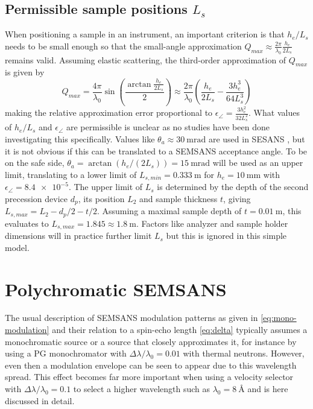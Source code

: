 \subsection{Permissible sample positions $L_s$}
When positioning a sample in an instrument, an important criterion is that $h_e/L_s$ needs to be small enough so that the small-angle approximation $Q_{max} \approx \frac{2\pi}{\lambda_0}\frac{h_e}{2L_s}$ remains valid. Assuming elastic scattering, the third-order approximation of $Q_{max}$ is given by
$$Q_{max} = \frac{4\pi}{\lambda_0}\sin(\frac{\arctan\frac{h_e}{2L_s}}{2}) \approx  \frac{2\pi}{\lambda_0}(\frac{h_e}{2L_s} - \frac{3h_e^3}{64L_s^3})$$
making the relative approximation error proportional to $\epsilon_\angle = \frac{3h_e^2}{32L_s^2}$. What values of $h_e/L_s$ and $\epsilon_\angle$ are permissible is unclear as no studies have been done investigating this specifically. Values like $\theta_a \approx \SI{30}{\milli\radian}$ are used in SESANS \cite{rekveldt1996}, but it is not obvious if this can be translated to a SEMSANS acceptance angle. To be on the safe side, $\theta_a = \arctan\left(h_e / (2L_s)\right) = \SI{15}{\milli\radian}$ will be used as an upper limit, translating to a lower limit of $L_{s,min} = \SI{0.333}{\meter}$ for $h_e = \SI{10}{\milli\meter}$ with $\epsilon_\angle = \num{8.4e-5}$. 
The upper limit of $L_s$ is determined by the depth of the second precession device $d_p$, its position $L_2$ and sample thickness $t$, giving $L_{s,max} = L_2 - d_p / 2 - t/2$. Assuming a maximal sample depth of $t=\SI{0.01}{\meter}$, this evaluates to $L_{s,max} = 1.845 \approx \SI{1.8}{\meter}$. Factors like analyzer and sample holder dimensions will in practice further limit $L_s$ but this is ignored in this simple model.
\section{Polychromatic SEMSANS}
\label{c3.6}
The usual description of SEMSANS modulation patterns as given in \eqref{eq:mono-modulation} and their relation to a spin-echo length \eqref{eq:delta} typically assumes a monochromatic source or a source that closely approximates it, for instance by using a PG monochromator with $\Delta\lambda/\lambda_0 = 0.01$ with thermal neutrons. However, even then a modulation envelope can be seen to appear \cite{bouwman2021} due to this wavelength spread. This effect becomes far more important when using a velocity selector with $\Delta\lambda/\lambda_0 = 0.1$ to select a higher wavelength such as $\lambda_0 = \SI{8}{\angstrom}$ and is here discussed in detail.
